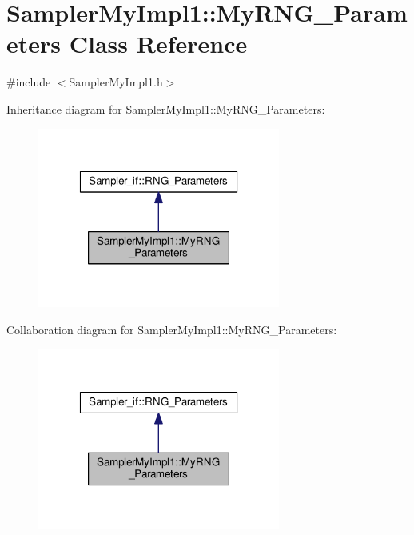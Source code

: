 \hypertarget{class_sampler_my_impl1_1_1_my_r_n_g___parameters}{\section{Sampler\-My\-Impl1\-:\-:My\-R\-N\-G\-\_\-\-Parameters Class Reference}
\label{class_sampler_my_impl1_1_1_my_r_n_g___parameters}
}


{\ttfamily \#include $<$Sampler\-My\-Impl1.\-h$>$}



Inheritance diagram for Sampler\-My\-Impl1\-:\-:My\-R\-N\-G\-\_\-\-Parameters\-:\nopagebreak
\begin{figure}[H]
\begin{center}
\leavevmode
\includegraphics[width=226pt]{class_sampler_my_impl1_1_1_my_r_n_g___parameters__inherit__graph}
\end{center}
\end{figure}


Collaboration diagram for Sampler\-My\-Impl1\-:\-:My\-R\-N\-G\-\_\-\-Parameters\-:\nopagebreak
\begin{figure}[H]
\begin{center}
\leavevmode
\includegraphics[width=226pt]{class_sampler_my_impl1_1_1_my_r_n_g___parameters__coll__graph}
\end{center}
\end{figure}

